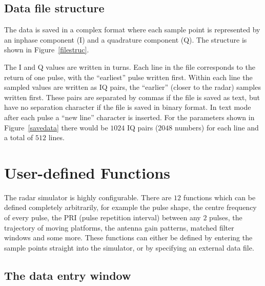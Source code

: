\subsection{Data file structure}

The data is saved in a complex format where each sample point is represented
by an inphase component (I) and a quadrature component (Q). The structure is
shown in Figure~\ref{filestruc}.


The I and Q values are written in turns. Each line in the file corresponds
to the return of one pulse, with the ``earliest'' pulse written first.
Within each line the sampled values are written as IQ pairs, the ``earlier''
(closer to the radar) samples written first. These pairs are separated by
commas if the file is saved as text, but have no separation character if the
file is saved in binary format. In text mode after each pulse a ``new line''
character is inserted. For the parameters shown in Figure~\ref{savedata}
there would be $1024$ IQ pairs ($2048$ numbers) for each line and a total of 
$512$ lines.

\section{User-defined Functions}

\label{userfunc}The radar simulator is highly configurable. There are $12$
functions which can be defined completely arbitrarily, for example the pulse
shape, the centre frequency of every pulse, the PRI (pulse repetition
interval) between any $2$ pulses, the trajectory of moving platforms, the
antenna gain patterns, matched filter windows and some more. These functions
can either be defined by entering the sample points straight into the
simulator, or by specifying an external data file.

\subsection{ The data entry window}

